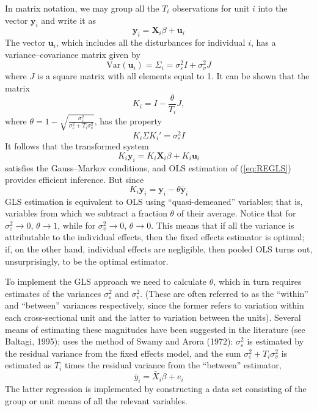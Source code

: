 In matrix notation, we may group all the $T_i$ observations for unit
$i$ into the vector $\mathbf{y}_i$ and write it as
\begin{equation}
\label{eq:REvec}
\mathbf{y}_{i} = \mathbf{X}_{i} \beta + \mathbf{u}_i
\end{equation}
The vector $\mathbf{u}_i$, which includes all the disturbances for
individual $i$, has a variance--covariance matrix given by
\begin{equation}
\label{eq:CovMatUnitI}
  \mbox{Var}(\mathbf{u}_i) = \Sigma_i = \sigma^2_{\varepsilon} I + \sigma^2_{v} J
\end{equation}
where $J$ is a square matrix with all elements equal to 1. It can be
shown that the matrix
\[
  K_i = I - \frac{\theta}{T_i} J,
\]
where $\theta = 1 -
\sqrt{\frac{\sigma^2_{\varepsilon}}{\sigma^2_{\varepsilon} + T_i
    \sigma^2_{v}}}$, has the property
\[
  K_i \Sigma K_i' = \sigma^2_{\varepsilon} I
\]
It follows that the transformed system
\begin{equation}
\label{eq:REGLS}
K_i \mathbf{y}_{i} = K_i \mathbf{X}_{i} \beta + K_i \mathbf{u}_i
\end{equation}
satisfies the Gauss--Markov conditions, and OLS estimation of
(\ref{eq:REGLS}) provides efficient inference. But since 
\[
  K_i \mathbf{y}_{i} = \mathbf{y}_{i} - \theta \bar{\mathbf{y}}_{i}
\]
GLS estimation is equivalent to OLS using ``quasi-demeaned''
variables; that is, variables from which we subtract a fraction
$\theta$ of their average. Notice that for $\sigma^2_{\varepsilon} \to
0$, $\theta \to 1$, while for $\sigma^2_{v} \to 0$, $\theta \to 0$.
This means that if all the variance is attributable to the individual
effects, then the fixed effects estimator is optimal; if, on the other
hand, individual effects are negligible, then pooled OLS turns out,
unsurprisingly, to be the optimal estimator.

To implement the GLS approach we need to calculate $\theta$, which in
turn requires estimates of the variances $\sigma^2_{\varepsilon}$ and
$\sigma^2_v$.  (These are often referred to as the ``within'' and
``between'' variances respectively, since the former refers to
variation within each cross-sectional unit and the latter to variation
between the units).  Several means of estimating these magnitudes have
been suggested in the literature (see Baltagi, 1995);  uses
the method of Swamy and Arora (1972): $\sigma^2_\varepsilon$ is
estimated by the residual variance from the fixed effects model, and
the sum $\sigma^2_\varepsilon + T_i \sigma^2_v$ is estimated as $T_i$
times the residual variance from the ``between'' estimator,
\[
\bar{y}_i = \bar{X}_i \beta + e_i
\]
The latter regression is implemented by constructing a data set
consisting of the group or unit means of all the relevant variables.


